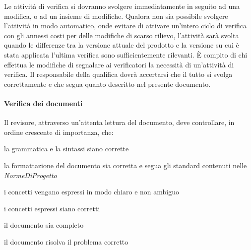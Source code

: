 Le attivit\`a di verifica si dovranno svolgere immediatamente in seguito ad una modifica, o ad un insieme di modifiche. Qualora non sia possibile svolgere l'attivit\`a in modo automatico, onde evitare di attivare un'intero ciclo di verifica con gli annessi costi per delle modifiche di scarso rilievo, l'attivit\`a sar\`a svolta quando le differenze tra la versione attuale del prodotto e la versione su cui \`e stata applicata l'ultima verifica sono sufficientemente rilevanti. \`E compito di chi effettua le modifiche di segnalare ai verificatori la necessit\`a di un'attivit\`a di verifica. Il responsabile della qualifica dovr\`a accertarsi che il tutto si svolga correttamente e che segua quanto descritto nel presente documento.
\paragraph{Verifica dei documenti} Il revisore, attraverso un'attenta lettura del documento, deve controllare, in ordine crescente di importanza, che:
\begin{elenconumerato}[\textbf{}]{\subsubsecindent}
\item la grammatica e la sintassi siano corrette
\item la formattazione del documento sia corretta e segua gli standard contenuti nelle \textit{NormeDiProgetto}
\item i concetti vengano espressi in modo chiaro e non ambiguo
\item i concetti espressi siano corretti
\item il documento sia completo
\item il documento risolva il problema corretto
\end{elenconumerato}
